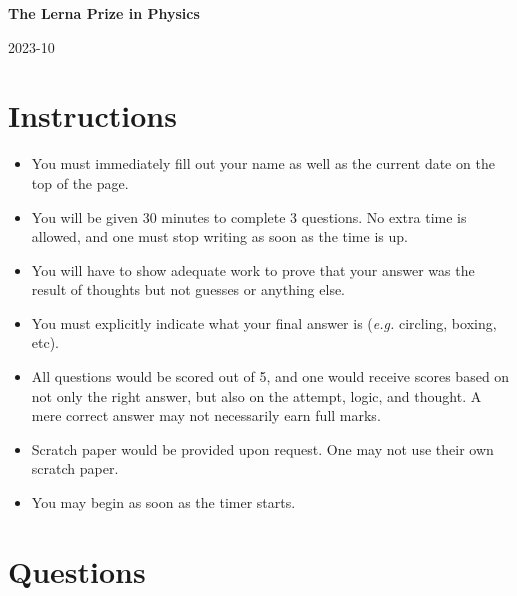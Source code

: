 \documentclass{exam}
\begin{document}
    \begin{center}
        \LARGE{\textbf{The Lerna Prize in Physics}}

        \vspace{8pt}

        \large{2023-10}
    \end{center}

    \section*{Instructions}
    \begin{itemize}
        \item You must immediately fill out your name as well as the current date on the top of the page.
        \item You will be given 30 minutes to complete 3 questions. No extra time is allowed, and one must stop writing as soon as the time is up.
        \item You will have to show adequate work to prove that your answer was the result of thoughts but not guesses or anything else.
        \item You must explicitly indicate what your final answer is (\textit{e.g.} circling, boxing, etc).
        \item All questions would be scored out of 5, and one would receive scores based on not only the right answer, but also on the attempt, logic, and thought. A mere correct answer may not necessarily earn full marks.
        \item Scratch paper would be provided upon request. One may not use their own scratch paper.
        \item You may begin as soon as the timer starts.
      \end{itemize}

\section*{Questions}
\end{document}
